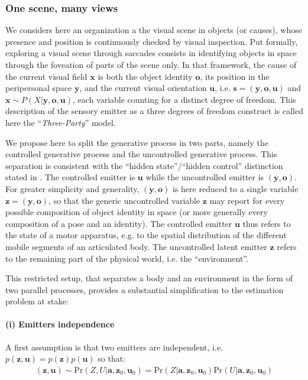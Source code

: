 \documentclass[12pt,twoside,openright]{article}
\begin{document}
\subsubsection{One scene, many views}

We considers here an organization a the visual scene in objects (or causes), whose presence and position is continuously checked by visual inspection. 
Put formally, exploring a visual scene through saccades consists in identifying objects in space through the foveation of parts of the scene only. 
In that framework, the cause of the current visual field $\boldsymbol{x}$ is both the object identity $\boldsymbol{o}$, its position in the peripersonal space $\boldsymbol{y}$, and the current visual orientation $\boldsymbol{u}$, i.e. $\boldsymbol{s} = (\boldsymbol{y},\boldsymbol{o},\boldsymbol{u})$ and $\boldsymbol{x} \sim P(X|\boldsymbol{y},\boldsymbol{o},\boldsymbol{u})$, each variable counting for a distinct degree of freedom. This description of the sensory emitter as a three degrees of freedom construct is called here the ``\emph{Three-Party}'' model.

We propose here to split the generative process in two parts, namely the controlled generative process and the uncontrolled generative process. 
This separation 
is consistent with the ``hidden state''/``hidden control'' distinction stated in \cite{friston2012perceptions}.
The controlled emitter is $\boldsymbol{u}$ while the uncontrolled emitter is  $(\boldsymbol{y}, \boldsymbol{o})$. 
For greater simplicity and generality, $(\boldsymbol{y},\boldsymbol{o})$ is here reduced to a single variable $\boldsymbol{z} = (\boldsymbol{y}, \boldsymbol{o})$, 
so that the generic uncontrolled variable $\boldsymbol{z}$ may report for every possible composition of object identity in space (or more generally every composition of a pose and an identity).
The controlled emitter $\boldsymbol{u}$ thus refers to the state of a motor apparatus, e.g. to the spatial distribution of the different mobile segments of an articulated body. The uncontrolled latent emitter $\boldsymbol{z}$  refers to the remaining part of the physical world, i.e. the ``environment''. 

This restricted setup, that separates a body and an environment in the form of two parallel processes,  provides a substantial simplification to the estimation problem at stake: 
\paragraph{(i) Emitters independence}
A first assumption is that two emitters are independent, i.e. $p(\boldsymbol{z}, \boldsymbol{u}) = p(\boldsymbol{z})p(\boldsymbol{u})$ so that:
\begin{align}
(\boldsymbol{z},\boldsymbol{u}) \sim \text{Pr}(Z,U|\boldsymbol{a}, \boldsymbol{z}_0, \boldsymbol{u}_0) = \text{Pr}(Z|\boldsymbol{a}, \boldsymbol{z}_0, \boldsymbol{u}_0) \text{Pr}(U|\boldsymbol{a}, \boldsymbol{z}_0, \boldsymbol{u}_0)\nonumber
\end{align}
	
\end{document}
